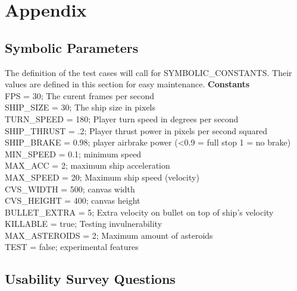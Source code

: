 \documentclass[12pt, titlepage]{article}
\begin{document}


\newpage

\section{Appendix}


\subsection{Symbolic Parameters}

The definition of the test cases will call for SYMBOLIC\_CONSTANTS.
Their values are defined in this section for easy maintenance.
\textbf{Constants}\\
FPS = 30; The curent frames per second\\
SHIP\_SIZE = 30; The ship size in pixels\\
TURN\_SPEED = 180; Player turn speed in degrees per second\\
SHIP\_THRUST = .2; Player thrust power in pixels per second squared \\
SHIP\_BRAKE = 0.98; player airbrake power (<0.9 = full stop 1 = no brake) \\
MIN\_SPEED = 0.1; minimum speed \\
MAX\_ACC = 2; maximum ship acceleration \\
MAX\_SPEED = 20; Maximum ship speed (velocity) \\
CVS\_WIDTH = 500; canvas width \\
CVS\_HEIGHT = 400; canvas height \\
BULLET\_EXTRA = 5; Extra velocity on bullet on top of ship's velocity \\
KILLABLE = true; Testing invulnerability \\
MAX\_ASTEROIDS = 2; Maximum amount of asteroids \\
TEST = false; experimental features \\


\subsection{Usability Survey Questions}
\label{interview:questions}
\end{document}
